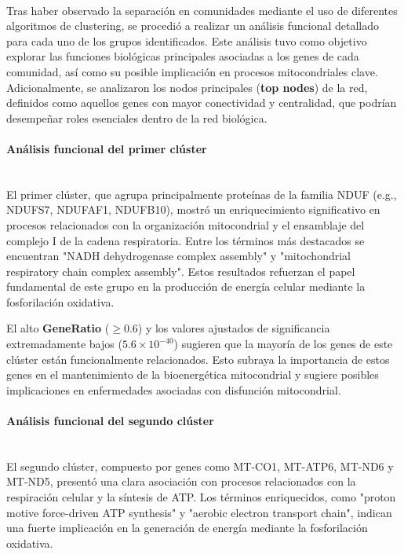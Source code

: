 \paragraph{}

Tras haber observado la separación en comunidades mediante el uso de diferentes algoritmos de clustering, se procedió a realizar un análisis funcional detallado para cada uno de los grupos identificados. Este análisis tuvo como objetivo explorar las funciones biológicas principales asociadas a los genes de cada comunidad, así como su posible implicación en procesos mitocondriales clave. Adicionalmente, se analizaron los nodos principales (\textbf{top nodes}) de la red, definidos como aquellos genes con mayor conectividad y centralidad, que podrían desempeñar roles esenciales dentro de la red biológica.

\paragraph{Análisis funcional del primer clúster} \mbox{}\\

El primer clúster, que agrupa principalmente proteínas de la familia NDUF (e.g., NDUFS7, NDUFAF1, NDUFB10), mostró un enriquecimiento significativo en procesos relacionados con la organización mitocondrial y el ensamblaje del complejo I de la cadena respiratoria. Entre los términos más destacados se encuentran "NADH dehydrogenase complex assembly" y "mitochondrial respiratory chain complex assembly". Estos resultados refuerzan el papel fundamental de este grupo en la producción de energía celular mediante la fosforilación oxidativa.

El alto \textbf{GeneRatio} (\(\geq 0.6\)) y los valores ajustados de significancia extremadamente bajos (\( 5.6 \times 10^{-40} \)) sugieren que la mayoría de los genes de este clúster están funcionalmente relacionados. Esto subraya la importancia de estos genes en el mantenimiento de la bioenergética mitocondrial y sugiere posibles implicaciones en enfermedades asociadas con disfunción mitocondrial.

\paragraph{Análisis funcional del segundo clúster} \mbox{}\\

El segundo clúster, compuesto por genes como MT-CO1, MT-ATP6, MT-ND6 y MT-ND5, presentó una clara asociación con procesos relacionados con la respiración celular y la síntesis de ATP. Los términos enriquecidos, como "proton motive force-driven ATP synthesis" y "aerobic electron transport chain", indican una fuerte implicación en la generación de energía mediante la fosforilación oxidativa.

